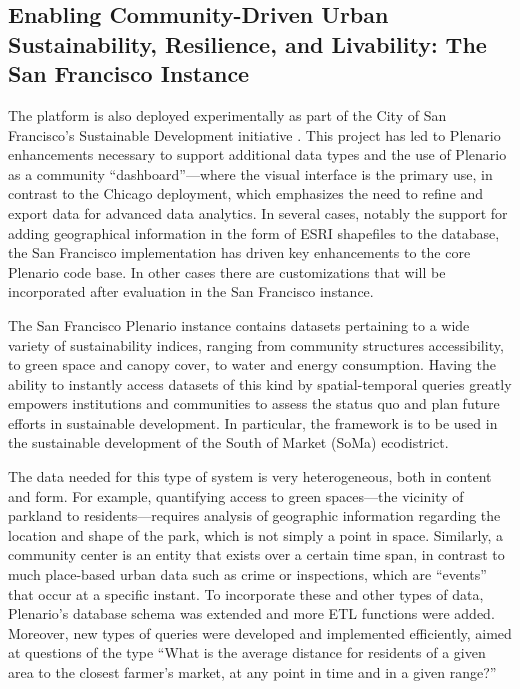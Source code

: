 \documentclass[11pt]{article}
\begin{document}
\subsection{\textbf{Enabling Community-Driven Urban Sustainability, Resilience, and Livability: The San Francisco Instance}}\label{san-francisco-instance}
The platform is also deployed experimentally as part of the City of San Francisco's Sustainable Development initiative \cite{sf-sustainable-systems}. This project has led to Plenario enhancements necessary to support additional data types and the use of Plenario as a community ``dashboard''---where the visual interface is the primary use, in contrast to the Chicago deployment, which emphasizes the need to refine and export data for advanced data analytics. In several cases, notably the support for adding geographical information in the form of ESRI shapefiles to the database, the San Francisco implementation has driven key enhancements to the core Plenario code base. In other cases there are customizations that will be incorporated after evaluation in the San Francisco instance.

The San Francisco Plenario instance contains datasets pertaining to a wide variety of sustainability indices, ranging from community structures accessibility, to green space and canopy cover, to water and energy consumption. Having the ability to instantly access datasets of this kind by spatial-temporal queries greatly empowers institutions and communities to assess the status quo and plan future efforts in sustainable development. In particular, the framework is to be used in the sustainable development of the South of Market (SoMa) ecodistrict.

The data needed for this type of system is very heterogeneous, both in content and form. For example, quantifying access to green spaces---the vicinity of parkland to residents---requires analysis of geographic information regarding the location and shape of the park, which is not simply a point in space. Similarly, a community center is an entity that exists over a certain time span, in contrast to much place-based urban data such as crime or inspections, which are ``events'' that occur at a specific instant. To incorporate these and other types of data, Plenario's database schema was extended and more ETL functions were added. Moreover, new types of queries were developed and implemented efficiently, aimed at questions of the type ``What is the average distance for residents of a given area to the closest farmer's market, at any point in time and in a given range?''
\end{document}
